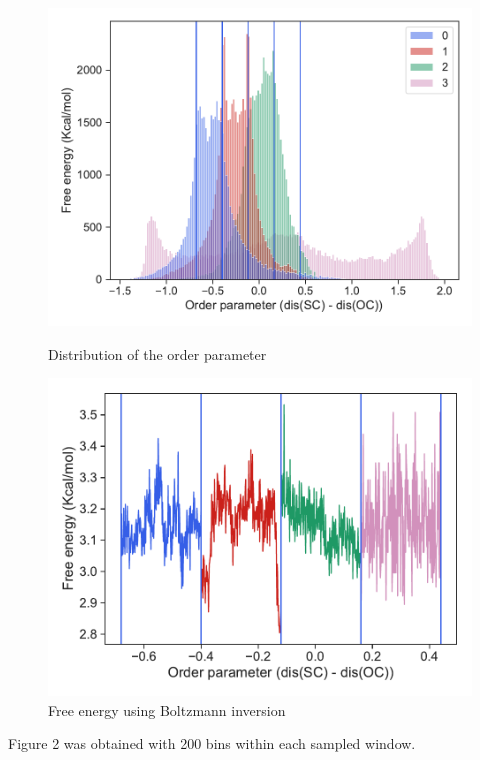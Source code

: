 \documentclass{article}
\begin{document}
\begin{figure}[ht]
  \centering
  \begin{minipage}[b]{0.45\linewidth}
    \includegraphics[scale=0.55]{figures/dist.pdf}
    \caption{Distribution of the order parameter}
    \label{fig:minipage1}
  \end{minipage}
  \quad
  \begin{minipage}[b]{0.45\linewidth}
    \includegraphics[scale=0.55]{figures/fenergy.pdf}
    \caption{Free energy using Boltzmann inversion}
    \label{fig:minipage2}
  \end{minipage}
\end{figure}

Figure 2 was obtained with 200 bins within each sampled window.
\end{document}
